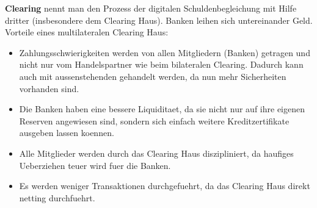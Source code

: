 \documentclass[a4paper]{article}
\begin{document}
\textbf{Clearing} nennt man den Prozess der digitalen Schuldenbegleichung
mit Hilfe dritter (insbesondere dem Clearing Haus).
Banken leihen sich untereinander Geld. \\

Vorteile eines multilateralen Clearing Haus:

\begin{itemize}
	\item Zahlungsschwierigkeiten werden von allen Mitgliedern (Banken) getragen
	      und nicht nur vom Handelspartner wie beim bilateralen Clearing. Dadurch
	      kann auch mit aussenstehenden gehandelt werden, da nun mehr Sicherheiten
	      vorhanden sind.

	\item Die Banken haben eine bessere Liquiditaet, da sie nicht nur auf ihre
	      eigenen Reserven angewiesen sind, sondern sich einfach weitere
	      Kreditzertifikate ausgeben lassen koennen.

	\item Alle Mitglieder werden durch das Clearing Haus diszipliniert, da
	      haufiges Ueberziehen teuer wird fuer die Banken.

	\item Es werden weniger Transaktionen durchgefuehrt, da das Clearing Haus
	      direkt netting durchfuehrt.
\end{itemize}
\end{document}
